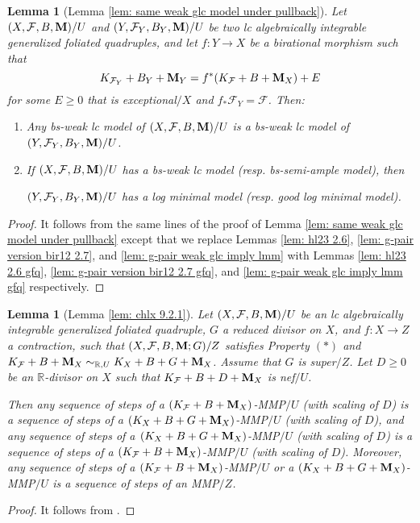 \documentclass[11pt]{amsart}
\numberwithin{equation}{section}
\newcommand{\Mm}{{\bf{M}}}
\newcommand{\Rr}{\mathbb{R}}
\newcommand{\Ff}{\mathcal{F}}
\newtheorem{lem}[thm]{Lemma}
\theoremstyle{definition}
\theoremstyle{definition}
\theoremstyle{definition}
\begin{document}
\begin{lem}[Lemma \ref{lem: same weak glc model under pullback}]\label{lem: same weak glc model under pullback gfq}
Let $(X,\Ff,B,\Mm)/U$ and $(Y,\Ff_Y,B_Y,\Mm)/U$ be two lc algebraically integrable generalized foliated quadruples, and let $f: Y\rightarrow X$ be a birational morphism such that
$$K_{\Ff_Y}+B_Y+\Mm_Y=f^*(K_\Ff+B+\Mm_X)+E$$
for some $E\geq 0$ that is exceptional$/X$ and $f_*\Ff_Y=\Ff$. Then:
\begin{enumerate}
    \item Any bs-weak lc model of $(X,\Ff,B,\Mm)/U$ is a bs-weak lc model of $(Y,\Ff_Y,B_Y,\Mm)/U$.
    \item If $(X,\Ff,B,\Mm)/U$ has a bs-weak lc model (resp. bs-semi-ample model), then
    
    $(Y,\Ff_Y,B_Y,\Mm)/U$ has a log minimal model (resp. good log minimal model).
\end{enumerate}
\end{lem}
\begin{proof}
    It follows from the same lines of the proof of Lemma \ref{lem: same weak glc model under pullback} except that we replace Lemmas \ref{lem: hl23 2.6}, \ref{lem: g-pair version bir12 2.7}, and \ref{lem: g-pair weak glc imply lmm} with Lemmas \ref{lem: hl23 2.6 gfq}, \ref{lem: g-pair version bir12 2.7 gfq}, and \ref{lem: g-pair weak glc imply lmm gfq} respectively.
\end{proof}

\begin{lem}[Lemma \ref{lem: chlx 9.2.1}]\label{lem: chlx 9.2.1 gfq}
    Let $(X,\Ff,B,\Mm)/U$ be an lc algebraically integrable generalized foliated quadruple, $G$ a reduced divisor on $X$, and $f: X\rightarrow Z$ a contraction, such that $(X,\Ff,B,\Mm;G)/Z$ satisfies Property $(*)$ and $K_{\Ff}+B+\Mm_X\sim_{\mathbb R,U}K_X+B+G+\Mm_X$. Assume that $G$ is super$/Z$. Let $D\geq 0$ be an $\Rr$-divisor on $X$ such that $K_{\Ff}+B+D+\Mm_X$ is nef$/U$.
    
    Then any sequence of steps of a $(K_{\Ff}+B+\Mm_X)$-MMP$/U$ (with scaling of $D$) is a sequence of steps of a $(K_{X}+B+G+\Mm_X)$-MMP$/U$ (with scaling of $D$), and any sequence of steps of a $(K_{X}+B+G+\Mm_X)$-MMP$/U$ (with scaling of $D$) is a sequence of steps of a  $(K_{\Ff}+B+\Mm_X)$-MMP$/U$ (with scaling of $D$). Moreover, any sequence of steps of a $(K_{\Ff}+B+\Mm_X)$-MMP$/U$ or a 
 $(K_{X}+B+G+\Mm_X)$-MMP$/U$ is a sequence of steps of an MMP$/Z$.
\end{lem}
\begin{proof}
    It follows from \cite[Lemma 9.2.1]{CHLX23}.
\end{proof}
\end{document}
